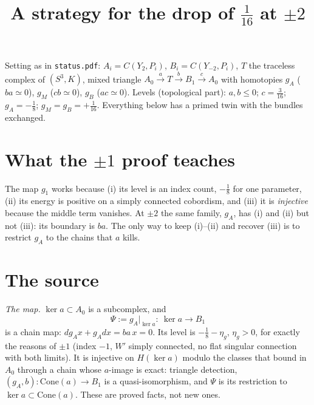 \documentclass[10pt]{amsart}
\title{A strategy for the drop of $\frac1{16}$ at $\pm2$}
\date{}
\newcommand{\st}[1]{\par\noindent\textit{#1}\enspace}
\newcommand{\Cone}{\mathrm{Cone}}
\begin{document}
\sloppy
\maketitle
\vspace{-2.5em}

\noindent{}
\medskip

\noindent Setting as in \texttt{status.pdf}: $A_i=C(Y_2,P_i)$, $B_i=C(Y_{-2},P_i)$, $T$ the
traceless complex of $(S^3,K)$, mixed triangle $A_0\xrightarrow{a}T\xrightarrow{b}B_1\xrightarrow{c}A_0$
with homotopies $g_A$ ($ba\simeq0$), $g_M$ ($cb\simeq0$), $g_B$ ($ac\simeq0$).
Levels (topological part): $a,b\le0$; $c=\frac3{16}$; $g_A=-\frac18$; $g_M=g_B=+\frac1{16}$.
Everything below has a primed twin with the bundles exchanged.

\section{What the $\pm1$ proof teaches}

The map $g_1$ works because (i) its level is an index count, $-\frac18$ for one parameter,
(ii) its energy is positive on a simply connected cobordism, and (iii) it is
\emph{injective} because the middle term vanishes. At $\pm2$ the same family, $g_A$, has (i)
and (ii) but not (iii): its boundary is $ba$. The only way to keep (i)--(ii) and recover
(iii) is to restrict $g_A$ to the chains that $a$ kills.

\section{The source}

\st{The map.} $\ker a\subset A_0$ is a subcomplex, and
\[
\Psi:=g_A\big|_{\ker a}\colon\ \ker a\longrightarrow B_1
\]
is a chain map: $d g_Ax+g_Adx=ba\,x=0$. Its level is $-\frac18-\eta_g$, $\eta_g>0$, for
exactly the reasons of $\pm1$ (index $-1$, $W'$ simply connected, no flat singular
connection with both limits). It is injective on $H(\ker a)$ modulo the classes that bound in
$A_0$ through a chain whose $a$-image is exact: triangle detection,
$(g_A,b)\colon\Cone(a)\to B_1$ is a quasi-isomorphism, and $\Psi$ is its restriction to
$\ker a\subset\Cone(a)$. These are proved facts, not new ones.
\end{document}
